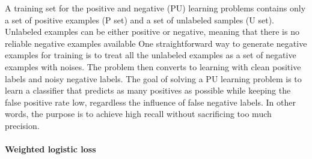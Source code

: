 A training set for the positive and negative (PU) learning problems contains only a set of positive examples (P set) and a set of unlabeled samples (U set).
Unlabeled examples can be either positive or negative, meaning that there is no reliable negative examples available
One straightforward way to generate negative examples for training is to treat all the unlabeled examples as a set of negative examples with noises.
The problem then converts to learning with clean positive labels and noisy negative labels.
The goal of solving a PU learning problem is to learn a classifier that predicts as many positives as possible while keeping the false positive rate low, regardless the influence of false negative labels.
In other words, the purpose is to achieve high recall without sacrificing too much precision.



\paragraph{Weighted logistic loss}

